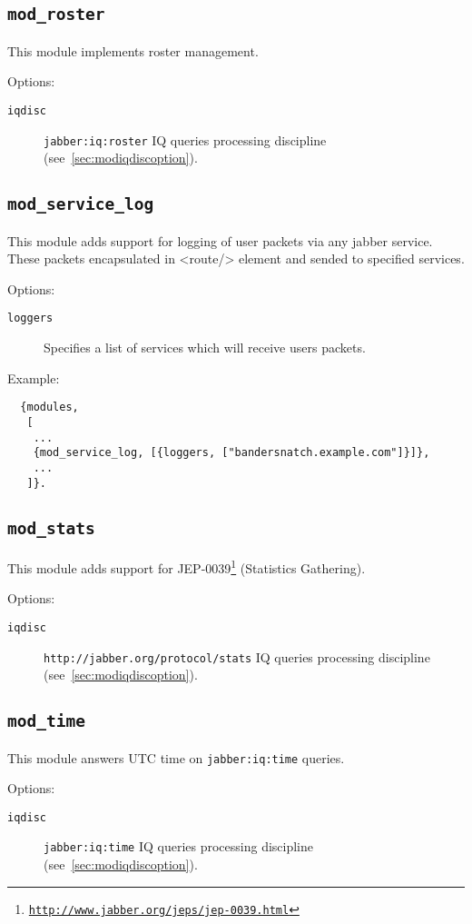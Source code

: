 \documentclass[a4paper,10pt]{article}
\newcommand{\bracehack}{\def\{{\char"7B}\def\}{\char"7D}}
\newcommand{\ns}[1]{\texttt{#1}}
\newcommand{\module}[1]{\texttt{#1}}
\newcommand{\modroster}{\module{mod\_roster}}
\newcommand{\modservicelog}{\module{mod\_service\_log}}
\newcommand{\modstats}{\module{mod\_stats}}
\newcommand{\modtime}{\module{mod\_time}}
\newcommand{\titem}[1]{\item[\bracehack\texttt{#1}]}
\gdef\footahref#1#2{#2\footnote{\href{#1}{\texttt{#1}}}}
\newcommand{\tjepref}[2]{\footahref{http://www.jabber.org/jeps/jep-#1.html}{#2}}
\newcommand{\jepref}[1]{\tjepref{#1}{JEP-#1}}
\newcommand{\iqdiscitem}[1]{\titem{iqdisc} #1 IQ queries processing
discipline (see~\ref{sec:modiqdiscoption}).}
\begin{document}
\subsection{\modroster{}}
\label{sec:modroster}

This module implements roster management.

Options:
\begin{description}
\iqdiscitem{\ns{jabber:iq:roster}}
\end{description}


\subsection{\modservicelog{}}
\label{sec:modservicelog}

This module adds support for logging of user packets via any jabber service.
These packets encapsulated in <route/> element and sended to specified
services.

Options:
\begin{description}
  \titem{loggers} Specifies a list of services which will receive users
  packets.
\end{description}

Example:
\begin{verbatim}
  {modules,
   [
    ...
    {mod_service_log, [{loggers, ["bandersnatch.example.com"]}]},
    ...
   ]}.
\end{verbatim}


\subsection{\modstats{}}
\label{sec:modstats}

This module adds support for \jepref{0039} (Statistics Gathering).

Options:
\begin{description}
\iqdiscitem{\ns{http://jabber.org/protocol/stats}}
\end{description}


\subsection{\modtime{}}
\label{sec:modtime}

This module answers UTC time on \ns{jabber:iq:time} queries.

Options:
\begin{description}
\iqdiscitem{\ns{jabber:iq:time}}
\end{description}
\end{document}
